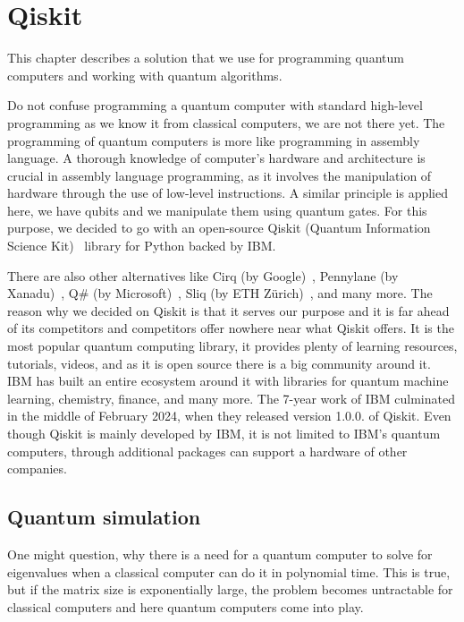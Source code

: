 \chapter{Qiskit}\label{ch:qiskit}
This chapter describes a solution that we use for programming quantum computers and working with quantum algorithms. 

Do not confuse programming a quantum computer with standard high-level programming as we know it from classical computers, we are not there yet. The programming of quantum computers is more like programming in assembly language. A thorough knowledge of computer's hardware and architecture is crucial in assembly language programming, as it involves the manipulation of hardware through the use of low-level instructions. A similar principle is applied here, we have qubits and we manipulate them using quantum gates. For this purpose, we decided to go with an open-source Qiskit (Quantum Information Science Kit)~\cite{qiskit} library for Python backed by IBM.

There are also other alternatives like Cirq (by Google)~\cite{cirq}, Pennylane (by Xanadu)~\cite{pennylane}, Q\# (by Microsoft)~\cite{qsharp}, Sliq (by ETH Zürich)~\cite{sliq}, and many more. The reason why we decided on Qiskit is that it serves our purpose and it is far ahead of its competitors and competitors offer nowhere near what Qiskit offers. It is the most popular quantum computing library, it provides plenty of learning resources, tutorials, videos, and as it is open source there is a big community around it. IBM has built an entire ecosystem around it \cite{qiskit_ecosystem} with libraries for quantum machine learning, chemistry, finance, and many more. The 7-year work of IBM culminated in the middle of February 2024, when they released version 1.0.0. of Qiskit. Even though Qiskit is mainly developed by IBM, it is not limited to IBM's quantum computers, through additional packages can support a hardware of other companies.

\section{Quantum simulation}
One might question, why there is a need for a quantum computer to solve for eigenvalues when a classical computer can do it in polynomial time. This is true, but if the matrix size is exponentially large, the problem becomes untractable for classical computers and here quantum computers come into play.

